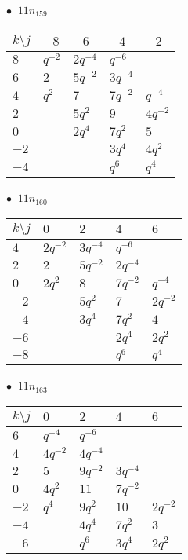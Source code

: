 \begin{minipage}{\linewidth}
$\bullet\ $ $11n_{159}$ \vspace{0.5em} \\
\begin{tabular}{l|llll}
$k \setminus j$ & $-8$ & $-6$ & $-4$ & $-2$ \\
\hline
$8$ & $q^{-2}$ & $2q^{-4}$ & $q^{-6}$ &  \\
$6$ & $2$ & $5q^{-2}$ & $3q^{-4}$ &  \\
$4$ & $q^{2}$ & $7$ & $7q^{-2}$ & $q^{-4}$ \\
$2$ &  & $5q^{2}$ & $9$ & $4q^{-2}$ \\
$0$ &  & $2q^{4}$ & $7q^{2}$ & $5$ \\
$-2$ &  &  & $3q^{4}$ & $4q^{2}$ \\
$-4$ &  &  & $q^{6}$ & $q^{4}$ \\
\end{tabular}
\vspace{2em}
\end{minipage}
%
\begin{minipage}{\linewidth}
$\bullet\ $ $11n_{160}$ \vspace{0.5em} \\
\begin{tabular}{l|llll}
$k \setminus j$ & $0$ & $2$ & $4$ & $6$ \\
\hline
$4$ & $2q^{-2}$ & $3q^{-4}$ & $q^{-6}$ &  \\
$2$ & $2$ & $5q^{-2}$ & $2q^{-4}$ &  \\
$0$ & $2q^{2}$ & $8$ & $7q^{-2}$ & $q^{-4}$ \\
$-2$ &  & $5q^{2}$ & $7$ & $2q^{-2}$ \\
$-4$ &  & $3q^{4}$ & $7q^{2}$ & $4$ \\
$-6$ &  &  & $2q^{4}$ & $2q^{2}$ \\
$-8$ &  &  & $q^{6}$ & $q^{4}$ \\
\end{tabular}
\vspace{2em}
\end{minipage}
%
\begin{minipage}{\linewidth}
$\bullet\ $ $11n_{163}$ \vspace{0.5em} \\
\begin{tabular}{l|llll}
$k \setminus j$ & $0$ & $2$ & $4$ & $6$ \\
\hline
$6$ & $q^{-4}$ & $q^{-6}$ &  &  \\
$4$ & $4q^{-2}$ & $4q^{-4}$ &  &  \\
$2$ & $5$ & $9q^{-2}$ & $3q^{-4}$ &  \\
$0$ & $4q^{2}$ & $11$ & $7q^{-2}$ &  \\
$-2$ & $q^{4}$ & $9q^{2}$ & $10$ & $2q^{-2}$ \\
$-4$ &  & $4q^{4}$ & $7q^{2}$ & $3$ \\
$-6$ &  & $q^{6}$ & $3q^{4}$ & $2q^{2}$ \\
\end{tabular}
\vspace{2em}
\end{minipage}
